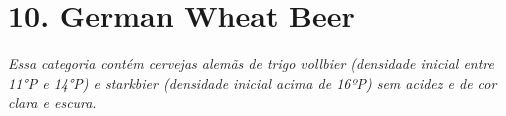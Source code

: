\section*{10. German Wheat Beer}
\textit{Essa categoria contém cervejas alemãs de trigo vollbier (densidade inicial entre 11°P e 14°P) e starkbier (densidade inicial acima de 16ºP) sem acidez e de cor clara e escura}.
